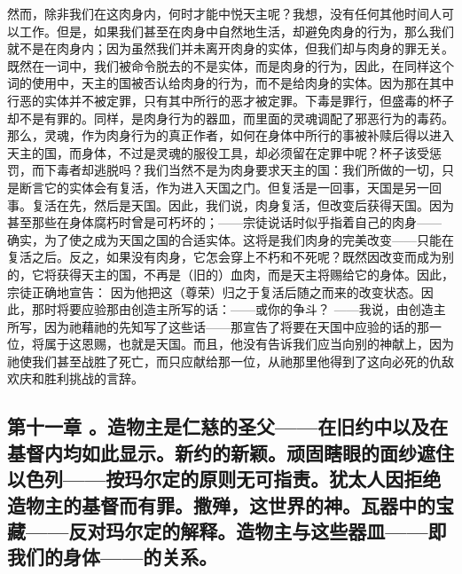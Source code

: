 然而，除非我们在这肉身内，何时才能中悦天主呢？我想，没有任何其他时间人可以工作。但是，如果我们甚至在肉身中自然地生活，却避免肉身的行为，那么我们就不是在肉身内；因为虽然我们并未离开肉身的实体，但我们却与肉身的罪无关。既然在一词中，我们被命令脱去的不是实体，而是肉身的行为，因此，在同样这个词的使用中，天主的国被否认给肉身的行为，而不是给肉身的实体。因为那在其中行恶的实体并不被定罪，只有其中所行的恶才被定罪。下毒是罪行，但盛毒的杯子却不是有罪的。同样，是肉身行为的器皿，而里面的灵魂调配了邪恶行为的毒药。那么，灵魂，作为肉身行为的真正作者，如何在身体中所行的事被补赎后得以进入天主的国，而身体，不过是灵魂的服役工具，却必须留在定罪中呢？杯子该受惩罚，而下毒者却逃脱吗？我们当然不是为肉身要求天主的国：我们所做的一切，只是断言它的实体会有复活，作为进入天国之门。但复活是一回事，天国是另一回事。复活在先，然后是天国。因此，我们说，肉身复活，但改变后获得天国。因为甚至那些在身体腐朽时曾是可朽坏的；——宗徒说话时似乎指着自己的肉身——  确实，为了使之成为天国之国的合适实体。这将是我们肉身的完美改变——只能在复活之后。反之，如果没有肉身，它怎会穿上不朽和不死呢？既然因改变而成为别的，它将获得天主的国，不再是（旧的）血肉，而是天主将赐给它的身体。因此，宗徒正确地宣告：  因为他把这（尊荣）归之于复活后随之而来的改变状态。因此，那时将要应验那由创造主所写的话：——或你的争斗？  ——我说，由创造主所写，因为祂藉祂的先知写了这些话——那宣告了将要在天国中应验的话的那一位，将属于这恩赐，也就是天国。而且，他没有告诉我们应当向别的神献上，因为祂使我们甚至战胜了死亡，而只应献给那一位，从祂那里他得到了这向必死的仇敌欢庆和胜利挑战的言辞。\par


\subsection{第十一章 。造物主是仁慈的圣父——在旧约中以及在基督内均如此显示。新约的新颖。顽固瞎眼的面纱遮住以色列——按玛尔定的原则无可指责。犹太人因拒绝造物主的基督而有罪。撒殚，这世界的神。瓦器中的宝藏——反对玛尔定的解释。造物主与这些器皿——即我们的身体——的关系。}


